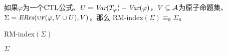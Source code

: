 \begin{corollary}
	如果$\varphi$为一个$\textrm{CTL}$公式、$U=\textit{Var}(T_\varphi)-\textit{Var}(\varphi)$，$V\subseteq\cal A$为原子命题集、
	$\Sigma=\emph{ERes}(\textsc{uf}(\varphi,V\cup U),V)$，那么
	RM-index$(\Sigma)\equiv_\emptyset \Sigma$。
\end{corollary}



\begin{algorithm}[tb]
	\caption{{RM-index}$(\Sigma)$}
	\label{alg:remove:index}
	\ForEach{$\Sigma$中拥有相同索引$\tuple{i}$的$\EXIST$-子句构成的极大子集$\Delta$}{
		\If{存在索引为$\tuple{i}$的$\EXIST$-某时子句$\alpha\in\Sigma$}
		{
			\lForEach{$\beta\in rei(\Delta)$}{
				$\Sigma\lto \Sigma \cup rfi(\alpha,\beta)$
			}
			$\Sigma\lto \Sigma-\{\alpha\}$\;
		}
		$\Sigma\lto \Sigma -\Delta \cup  rxi(\Delta)$\;
	}
	\Return $\Sigma$
\end{algorithm}

%	


